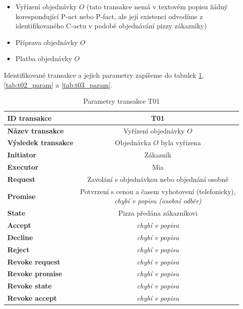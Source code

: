 \documentclass[]{article}
\begin{document}
\begin{itemize}
\item Vyřízení objednávky $O$ (tato transakce nemá v textovém popisu žádný korespondující P-act nebo P-fact, ale její existenci odvodíme z identifikovaného C-actu v podobě objednávání pizzy zákazníky)
\item Příprava objednávky $O$ 
\item Platba objednávky $O$ 
\end{itemize}

Identifikované transakce a jejich parametry zapíšeme do tabulek \ref{tab:t01_param}, \ref{tab:t02_param} a \ref{tab:t03_param}.

\begin{table} [H] \centering
\begin{tabular}{|>{\bfseries} l| | c |}
\hline
  ID transakce & T01 \\
\hline
  Název transakce & Vyřízení objednávky $O$  \\
\hline
  Výsledek transakce & Objednávka $O$ byla vyřízena \\
\hline
  Initiator & Zákazník \\
\hline
  Executor & Mia \\
\hline
\hline
  Request & Zavolání s objednávkou nebo objednání osobně \\
\hline
  Promise & \makecell{Potvrzení s cenou a časem vyhotovení (telefonicky), \\ \textit{chybí v popisu (osobní odběr)}}\\
\hline
  State & Pizza předána zákazníkovi \\
\hline
  Accept & \textit{chybí v popisu} \\
\hline
\hline
  Decline &  \textit{chybí v popisu} \\
\hline
  Reject & \textit{chybí v popisu} \\
\hline
\hline
  Revoke request & \textit{chybí v popisu} \\
\hline
  Revoke promise & \textit{chybí v popisu} \\
\hline
  Revoke state & \textit{chybí v popisu} \\
\hline
  Revoke accept & \textit{chybí v popisu} \\
\hline
\end{tabular}
\caption{Parametry transakce T01}
\label{tab:t01_param}
\end{table}
\end{document}
